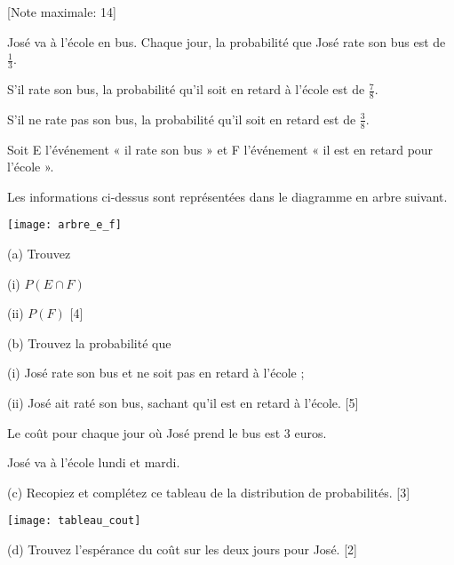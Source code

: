 \begin{question}
  \hspace*{\fill} [Note maximale: 14]\par
  \medskip

  \noindent José va à l’école en bus. Chaque jour, la probabilité que José rate son bus est de $\frac{1}{3}$.\par
  \noindent S’il rate son bus, la probabilité qu’il soit en retard à l’école est de $\frac{7}{8}$.\par
  \noindent S’il ne rate pas son bus, la probabilité qu’il soit en retard est de $\frac{3}{8}$.\par
  \noindent Soit E l’événement « il rate son bus » et F l’événement « il est en retard pour l’école ».\par
  \noindent Les informations ci-dessus sont représentées dans le diagramme en arbre suivant.\par
  \medskip
  \texttt{[image: arbre\_e\_f]}\par  
  \medskip
  (a) Trouvez\par
  \hspace{2em}(i)  $P(E \cap F)$\par  
  \hspace{2em}(ii) $P(F)$\hspace*{\fill} [4]\par  
  \medskip
  (b) Trouvez la probabilité que\par
  \hspace{2em}(i)  José rate son bus et ne soit pas en retard à l’école ;\par
  \hspace{2em}(ii) José ait raté son bus, sachant qu’il est en retard à l’école.\hspace*{\fill} [5]\par
  \medskip

  \noindent Le coût pour chaque jour où José prend le bus est 3 euros.\par
  \noindent José va à l’école lundi et mardi.\par
  \medskip

  (c) Recopiez et complétez ce tableau de la distribution de probabilités.\hspace*{\fill} [3]\par
  \medskip
  \texttt{[image: tableau\_cout]}\par  
  \medskip
  (d) Trouvez l’espérance du coût sur les deux jours pour José.\hspace*{\fill} [2]\par
  
\end{question}

